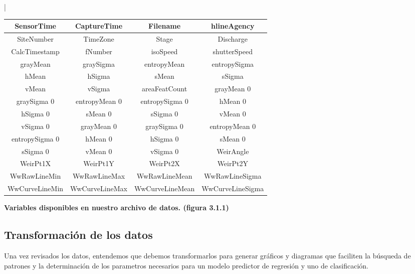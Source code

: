 |\documentclass{article}
\begin{document}
        \begin{adjustbox}{left=-0.25cm}

	\begin{tabular}{ |c | c| c| c |} 
        \hline
            SensorTime  & CaptureTime  & Filename  &  hlineAgency \\ 
             \hline
            SiteNumber  & TimeZone  & Stage  & Discharge \\
             \hline
            CalcTimestamp & fNumber  & isoSpeed  & shutterSpeed   \\
             \hline
            grayMean  & graySigma  & entropyMean  & entropySigma  \\
             \hline
            hMean  & hSigma  & sMean  & sSigma  \\
             \hline
            vMean  & vSigma  & areaFeatCount  & grayMean 0 \\
             \hline
            graySigma 0  &  entropyMean 0  &  entropySigma 0  &   hMean 0  \\
             \hline
            hSigma 0  &  sMean 0  &  sSigma 0  &  vMean 0  \\
             \hline
            vSigma 0  &  grayMean 0  &  graySigma 0  & entropyMean 0 \\
             \hline
            entropySigma 0  &  hMean 0  &  hSigma 0  & sMean 0 \\
             \hline
            sSigma 0  & vMean 0  &  vSigma 0  & WeirAngle  \\
             \hline
            WeirPt1X  & WeirPt1Y  & WeirPt2X  &  WeirPt2Y \\
             \hline
            WwRawLineMin  & WwRawLineMax  & WwRawLineMean  &  WwRawLineSigma \\
             \hline
            WwCurveLineMin  & WwCurveLineMax  &  WwCurveLineMean  & WwCurveLineSigma   \\
        \hline
        \end{tabular}
        \end{adjustbox}

       \begin{center}
           \textbf{Variables disponibles en nuestro archivo de datos. (figura 3.1.1)} \\
       \end{center}     
        

    \subsection{Transformación de los datos}
        Una vez revisados los datos, entendemos que debemos transformarlos para generar gráficos y diagramas que faciliten la búsqueda de patrones y la determinación de los parametros necesarios para un modelo predictor de regresión y uno de clasificación.
        
\end{document}
